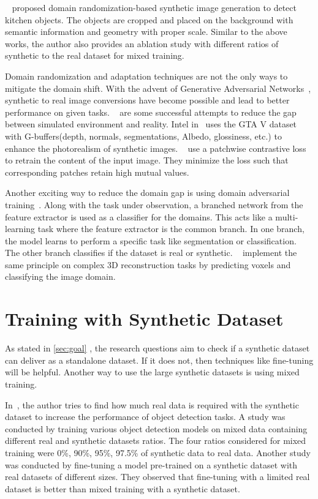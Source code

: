 ~\cite{georgakis2017synthesizing} proposed domain randomization-based synthetic image generation to detect kitchen objects.
The objects are cropped and placed on the background with semantic information and geometry with proper scale.
Similar to the above works, the author also provides an ablation study with different ratios of synthetic to the real dataset for mixed training.

Domain randomization and adaptation techniques are not the only ways to mitigate the domain shift.
With the advent of Generative Adversarial Networks~\cite{Goodfellow2014}, synthetic to real image conversions have become possible and lead to better performance on given tasks.
~\cite{Richter_2021, CycleGAN2017, park2020cut,isola2017image, dundar2018domain,Wang2018HighResolutionIS} are some successful attempts to reduce the gap between simulated environment and reality.
Intel in~\cite{Richter_2021} uses the GTA V dataset with G-buffers(depth, normals, segmentations, Albedo, glossiness, etc.) to enhance the photorealism of synthetic images.
~\cite{park2020cut} use a patchwise contrastive loss to retrain the content of the input image.
They minimize the loss such that corresponding patches retain high mutual values.

Another exciting way to reduce the domain gap is using domain adversarial training~\cite{Ganin2017}.
Along with the task under observation, a branched network from the feature extractor is used as a classifier for the domains.
This acts like a multi-learning task where the feature extractor is the common branch.
In one branch, the model learns to perform a specific task like segmentation or classification.
The other branch classifies if the dataset is real or synthetic.
~\cite{Pinheiro2019} implement the same principle on complex 3D reconstruction tasks by predicting voxels and classifying the image domain.

\section{Training with Synthetic Dataset}\label{subsec:training-with-synthetic-dataset}
As stated in \autoref{sec:goal} , the research questions aim to check if a synthetic dataset can deliver as a standalone dataset.
If it does not, then techniques like fine-tuning will be helpful.
Another way to use the large synthetic datasets is using mixed training.

In~\cite{nowruzi2019real},  the author tries to find how much real data is required with the synthetic dataset to increase the performance of object detection tasks.
A study was conducted by training various object detection models on mixed data containing different real and synthetic datasets ratios.
The four ratios considered for mixed training were 0\%, 90\%, 95\%, 97.5\% of synthetic data to real data.
Another study was conducted by fine-tuning a model pre-trained on a synthetic dataset with real datasets of different sizes.
They observed that fine-tuning with a limited real dataset is better than mixed training with a synthetic dataset.


